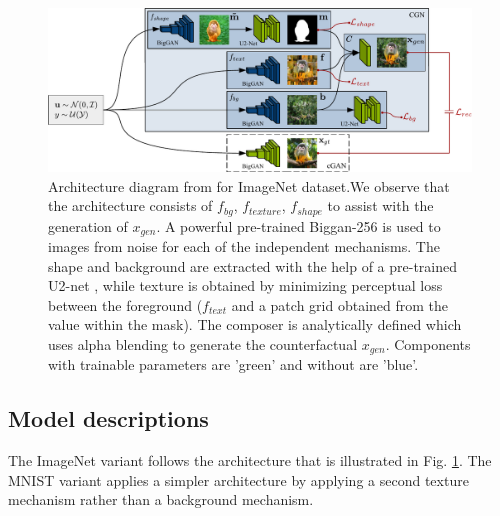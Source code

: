 \begin{figure}[H]
  \centering
  \includegraphics[width=0.9\linewidth]{../openreview/images/arch_diagram.pdf}
  \caption{Architecture diagram from \cite{sauer2021counterfactual} for ImageNet \cite{imagenet} dataset.We observe that the architecture consists of $f_{bg}$, $f_{texture}$, $f_{shape}$ to assist with the generation of $x_{gen}$. A powerful pre-trained Biggan-256 \cite{brock2019large} is used to images from noise for each of the independent mechanisms. The shape and background are extracted with the help of a pre-trained U2-net \cite{qin2020u2}, while texture is obtained by minimizing perceptual loss between the foreground ($f_{text}$ and a patch grid obtained from the value within the mask). The composer is analytically defined which uses alpha blending to generate the counterfactual $x_{gen}$. Components with trainable parameters are 'green' and without are 'blue'. 
  }
  \label{fig:arch_diagram}
\end{figure}




\subsection{Model descriptions}

The ImageNet variant follows the architecture that is illustrated in Fig. \ref{fig:arch_diagram}. The MNIST variant applies a simpler architecture by applying a second texture mechanism rather than a background mechanism.


